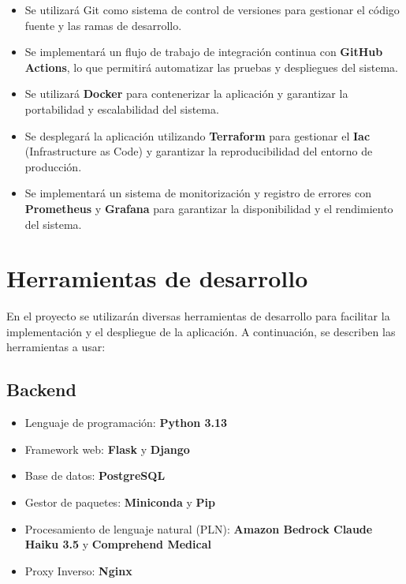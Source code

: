 \begin{itemize}
    \item Se utilizará Git como sistema de control de versiones para gestionar el código fuente y las ramas de desarrollo.
    \item Se implementará un flujo de trabajo de integración continua con \textbf{GitHub Actions}, lo que permitirá automatizar las pruebas y despliegues del sistema.
    \item Se utilizará \textbf{Docker} para contenerizar la aplicación y garantizar la portabilidad y escalabilidad del sistema.
    \item Se desplegará la aplicación utilizando \textbf{Terraform} para gestionar el \textbf{Iac} (Infrastructure as Code) y garantizar la reproducibilidad del entorno de producción.
    \item Se implementará un sistema de monitorización y registro de errores con \textbf{Prometheus} y \textbf{Grafana} para garantizar la disponibilidad y el rendimiento del sistema.
\end{itemize}

\section{Herramientas de desarrollo}

En el proyecto se utilizarán diversas herramientas de desarrollo para facilitar la implementación y el despliegue de la aplicación. A continuación, se describen las herramientas a usar:

\subsection{Backend}

\begin{itemize}
    \item Lenguaje de programación: \textbf{Python 3.13}
    \item Framework web: \textbf{Flask} y \textbf{Django}
    \item Base de datos: \textbf{PostgreSQL}
    \item Gestor de paquetes: \textbf{Miniconda} y \textbf{Pip}
    \item Procesamiento de lenguaje natural (PLN): \textbf{Amazon Bedrock Claude Haiku 3.5} y \textbf{Comprehend Medical}
    \item Proxy Inverso: \textbf{Nginx}
\end{itemize}

